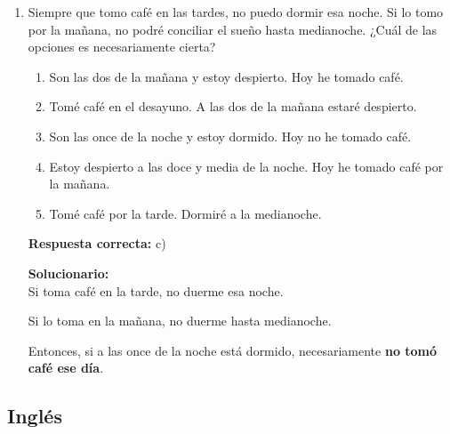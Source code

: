 \begin{enumerate}
	Luego se amplía la variedad de las plantas: V.
	
	Después se señala su función principal: III.
	
	Finalmente se mencionan las condiciones para su desarrollo: I, y se precisa una de ellas: IV.
	
	Orden:
	
	II -- V -- III -- I -- IV
	
	\vspace{6mm}
	
	\item Siempre que tomo café en las tardes, no puedo dormir esa noche. Si lo tomo por la mañana, no podré conciliar el sueño hasta medianoche. ¿Cuál de las opciones es necesariamente cierta?
	\begin{enumerate}[label=\alph*)]
		\item Son las dos de la mañana y estoy despierto. Hoy he tomado café.
		\item Tomé café en el desayuno. A las dos de la mañana estaré despierto.
		\item Son las once de la noche y estoy dormido. Hoy no he tomado café.
		\item Estoy despierto a las doce y media de la noche. Hoy he tomado café por la mañana.
		\item Tomé café por la tarde. Dormiré a la medianoche.
	\end{enumerate}
	\textbf{Respuesta correcta:} c)
	
	\vspace{2mm}
	\textbf{Solucionario:}\\
	Si toma café en la tarde, no duerme esa noche.
	
	Si lo toma en la mañana, no duerme hasta medianoche.
	
	Entonces, si a las once de la noche está dormido, necesariamente \textbf{no tomó café ese día}.
	
	\vspace{6mm}
\end{enumerate}

\subsection*{Inglés}

